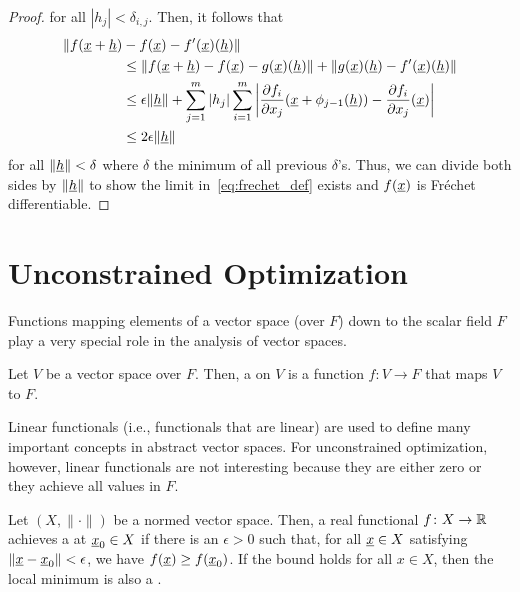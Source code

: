 \begin{proof}
for all $|h_j| < \delta_{i,j}$.
Then, it follows that
\begin{align*}
\| f(\underline{x}+\underline{h}) & - f(\underline{x}) - f'(\underline{x}) (\underline{h}) \|  \\ &\leq \| f(\underline{x}+\underline{h}) - f(\underline{x}) - g(\underline{x}) (\underline{h}) \| + \| g(\underline{x})(\underline{h}) - f'(\underline{x}) (\underline{h}) \| \\
&\leq \epsilon \|\underline{h}\| + \sum_{j=1}^m |h_j| \sum_{i=1}^m \left| \frac{\partial f_i}{\partial x_j} (\underline{x}+\phi_{j-1}(\underline{h})) - \frac{\partial f_i}{\partial x_j} (\underline{x}) \right| \\
&\leq  2 \epsilon \| \underline{h} \| 
\end{align*}
for all $\| \underline{h} \| < \delta$ where $\delta$ the minimum of all previous $\delta$'s.
Thus, we can divide both sides by $\|\underline{h}\|$ to show the limit in~\eqref{eq:frechet_def} exists and $f(\underline{x})$ is Fr\'{e}chet differentiable.
\end{proof}
\fi


\section{Unconstrained Optimization}

Functions mapping elements of a vector space (over $F$) down to the scalar field $F$ play a very special role in the analysis of vector spaces.

\begin{definition}
Let $V$ be a vector space over $F$.
Then, a  on $V$ is a function $f \colon V \rightarrow F$ that maps $V$ to $F$.
\end{definition}

Linear functionals (i.e., functionals that are linear) are used to define many important concepts in abstract vector spaces.
For unconstrained optimization, however, linear functionals are not interesting because they are either zero or they achieve all values in $F$.

\begin{definition}
\label{definition:minimum_value}
Let $(X,\|\cdot\|)$ be a normed vector space.
Then, a real functional $f \colon X \rightarrow \mathbb{R}$ achieves a  at $\underline{x}_0 \in X$ if there is an $\epsilon > 0$ such that, for all $\underline{x}\in X$ satisfying $\| \underline{x} - \underline{x}_0 \| < \epsilon$, we have  $f(\underline{x}) \geq f(\underline{x}_0)$.
If the bound holds for all $x\in X$, then the local minimum is also a .
\end{definition}

